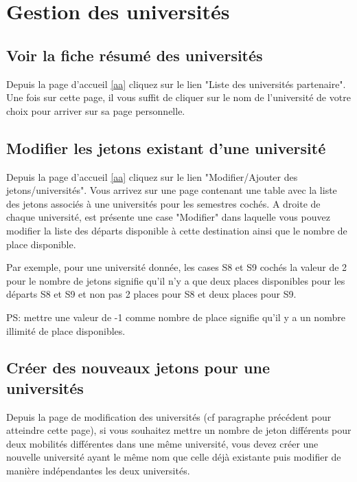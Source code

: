         


\section{Gestion des universités}

\subsection{Voir la fiche résumé des universités}

Depuis la page d'accueil \ref{aa} cliquez sur le lien "Liste des universités partenaire". Une fois sur cette page, il vous suffit de cliquer sur le nom de l'université de votre choix pour arriver sur sa page personnelle.
 
\subsection{Modifier les jetons existant d'une université}
\label{mj}
Depuis la page d'accueil \ref{aa} cliquez sur le lien "Modifier/Ajouter des jetons/universités". Vous arrivez sur une page contenant une table avec la liste des jetons associés à une universités pour les semestres cochés. A droite de chaque université, est présente une case "Modifier" dans laquelle vous pouvez modifier la liste des départs disponible à cette destination ainsi que le nombre de place disponible.

\smallbreak

Par exemple, pour une université donnée, les cases S8 et S9 cochés la valeur de 2 pour le nombre de jetons signifie qu'il n'y a que deux places disponibles pour les départs S8 et S9 et non pas 2 places pour S8 et deux places pour S9.

\smallbreak

PS: mettre une valeur de -1 comme nombre de place signifie qu'il y a un nombre illimité de place disponibles.

\subsection{Créer des nouveaux jetons pour une universités}
\label{cj}

Depuis la page de modification des universités (cf paragraphe précédent pour atteindre cette page), si vous souhaitez mettre un nombre de jeton différents pour deux mobilités différentes dans une même université, vous devez créer une nouvelle université ayant le même nom que celle déjà existante puis modifier de manière indépendantes les deux universités.

